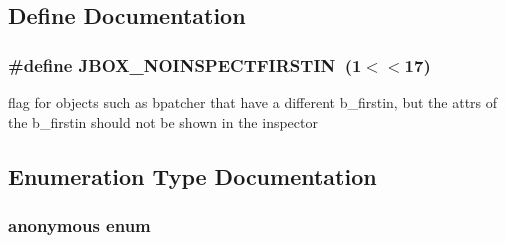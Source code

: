 \subsection{Define Documentation}
\hypertarget{group__jbox_ga789716317916c1e160d4ac0ef909446b}{
\subsubsection[{JBOX\_\-NOINSPECTFIRSTIN}]{\setlength{\rightskip}{0pt plus 5cm}\#define JBOX\_\-NOINSPECTFIRSTIN~(1$<$$<$17)}}
\label{group__jbox_ga789716317916c1e160d4ac0ef909446b}


flag for objects such as bpatcher that have a different b\_\-firstin, but the attrs of the b\_\-firstin should not be shown in the inspector 

\subsection{Enumeration Type Documentation}
\hypertarget{group__jbox_ga80155586fa275b28773c9b203f52caba}{
\subsubsection[{"@17}]{\setlength{\rightskip}{0pt plus 5cm}anonymous enum}}
\label{group__jbox_ga80155586fa275b28773c9b203f52caba}


